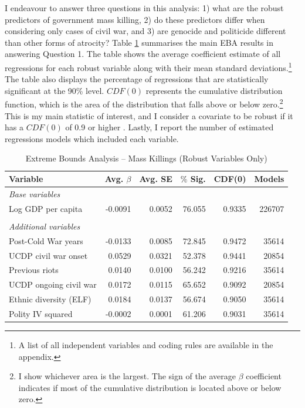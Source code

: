 I endeavour to answer three questions in this analysis: 1) what are the robust predictors of government mass killing, 2) do these predictors differ when considering only cases of civil war, and 3) are genocide and politicide different than other forms of atrocity? Table \ref{tab:eba01} summarises the main EBA results in answering Question 1. The table shows the average coefficient estimate of all regressions for each robust variable along with their mean standard deviations.\footnote{A list of all independent variables and coding rules are available in the appendix.} The table also displays the percentage of regressions that are statistically significant at the 90\% level. $CDF(0)$ represents the cumulative distribution function, which is the area of the distribution that falls above or below zero.\footnote{I show whichever area is the largest. The sign of the average $\beta$ coefficient indicates if most of the cumulative distribution is located above or below zero.} This is my main statistic of interest, and I consider a covariate to be robust if it has a $CDF(0)$ of 0.9 or higher \citep[181]{sala1997just}. Lastly, I report the number of estimated regressions models which included each variable.

\begin{table}[H]
\centering
\begin{tabular}{lrrrrr}
\hline
\textbf{Variable} & \textbf{Avg. $\beta$} & \textbf{Avg. SE} & \textbf{$\%$ Sig.} & \textbf{CDF(0)} & \textbf{Models} \\ \hline
\textit{Base variables} &  &  &  &  &  \\
Log GDP per capita & -0.0091 & 0.0052 & 76.055 & 0.9335 & 226707 \\
 &  &  &  &  &  \\
\textit{Additional variables} &  &  &  &  &  \\
Post-Cold War years & -0.0133 & 0.0085 & 72.845 & 0.9472 & 35614 \\
UCDP civil war onset & 0.0529 & 0.0321 & 52.378 & 0.9441 & 20854 \\
Previous riots & 0.0140 & 0.0100 & 56.242 & 0.9216 & 35614 \\
UCDP ongoing civil war & 0.0172 & 0.0115 & 65.652 & 0.9092 & 20854 \\
Ethnic diversity (ELF) & 0.0184 & 0.0137 & 56.674 & 0.9050 & 35614 \\
Polity IV squared & -0.0002 & 0.0001 & 61.206 & 0.9031 & 35614 \\ \hline
\end{tabular}
\caption{Extreme Bounds Analysis -- Mass Killings (Robust Variables Only)}
\label{tab:eba01}
\end{table}
	
